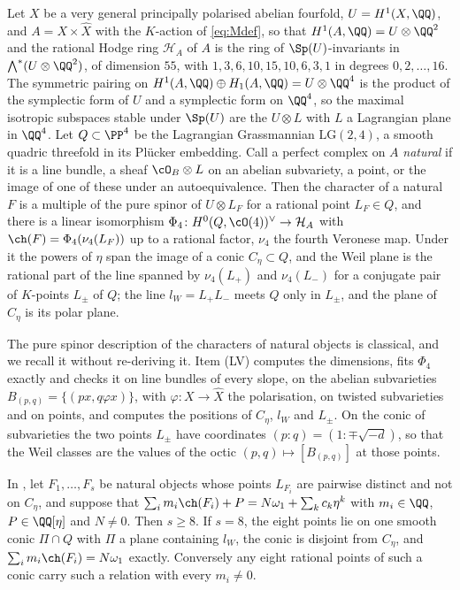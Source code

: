 \begin{setupenv}\label{setup:lagquadric}
Let $X$ be a very general principally polarised abelian fourfold,
$U=H^{1}(X,\QQ)$, and $A=X\times\widehat{X}$ with the $K$-action of
\eqref{eq:Mdef}, so that $H^{1}(A,\QQ)=U\otimes\QQ^{2}$ and the rational Hodge
ring $\mathcal{H}_{A}$ of $A$ is the ring of $\Sp(U)$-invariants in
$\bigwedge^{*}(U\otimes\QQ^{2})$, of dimension $55$, with
$1,3,6,10,15,10,6,3,1$ in degrees $0,2,\dots,16$. The symmetric pairing on
$H^{1}(A,\QQ)\oplus H_{1}(A,\QQ)=U\otimes\QQ^{4}$ is the product of the
symplectic form of $U$ and a symplectic form on $\QQ^{4}$, so the maximal
isotropic subspaces stable under $\Sp(U)$ are the $U\otimes L$ with $L$ a
Lagrangian plane in $\QQ^{4}$. Let $Q\subset\PP^{4}$ be the Lagrangian
Grassmannian $\mathrm{LG}(2,4)$, a smooth quadric threefold in its
Pl\"ucker embedding. Call a perfect complex on $A$ \emph{natural} if it is a line
bundle, a sheaf $\cO_{B}\otimes L$ on an abelian subvariety, a point, or the
image of one of these under an autoequivalence. Then the character of a natural
$F$ is a multiple of the pure spinor of $U\otimes L_{F}$ for a rational point
$L_{F}\in Q$, and there is a linear isomorphism
$\Phi_{4}\colon H^{0}(Q,\cO(4))^{\vee}\to\mathcal{H}_{A}$ with
$\ch(F)=\Phi_{4}(\nu_{4}(L_{F}))$ up to a rational factor, $\nu_{4}$ the
fourth Veronese map. Under it the powers of $\eta$ span the image of a conic
$C_{\eta}\subset Q$, and the Weil plane is the rational part of the line
spanned by $\nu_{4}(L_{+})$ and $\nu_{4}(L_{-})$ for a conjugate pair of
$K$-points $L_{\pm}$ of $Q$; the line $l_{W}=L_{+}L_{-}$ meets $Q$ only in
$L_{\pm}$, and the plane of $C_{\eta}$ is its polar plane.
\end{setupenv}

The pure spinor description of the characters of natural objects is
classical, and we recall it without re-deriving it. Item (LV) computes the
dimensions, fits $\Phi_{4}$ exactly and checks it on line bundles of every
slope, on the abelian subvarieties $B_{(p,q)}=\{(px,q\varphi x)\}$, with
$\varphi\colon X\to\widehat{X}$ the polarisation, on twisted subvarieties and
on points, and computes the positions of $C_{\eta}$, $l_{W}$ and $L_{\pm}$. On
the conic of subvarieties the two points $L_{\pm}$ have coordinates
$(p:q)=(1:\mp\sqrt{-d})$, so that the Weil classes are the values of the
octic $(p,q)\mapsto[B_{(p,q)}]$ at those points.

\begin{theorem}[Minimal support at $n=4$]\label{thm:minimalsupport}
In , let $F_{1},\dots,F_{s}$ be natural objects whose
points $L_{F_{i}}$ are pairwise distinct and not on $C_{\eta}$, and suppose
that $\sum_{i}m_{i}\ch(F_{i})+P=N\omega_{1}+\sum_{k}c_{k}\eta^{k}$ with
$m_{i}\in\QQ$, $P\in\QQ[\eta]$ and $N\ne0$. Then $s\ge8$. If $s=8$, the eight
points lie on one smooth conic $\Pi\cap Q$ with $\Pi$ a plane containing
$l_{W}$, the conic is disjoint from $C_{\eta}$, and
$\sum_{i}m_{i}\ch(F_{i})=N\omega_{1}$ exactly. Conversely any eight rational
points of such a conic carry such a relation with every $m_{i}\ne0$.
\end{theorem}

